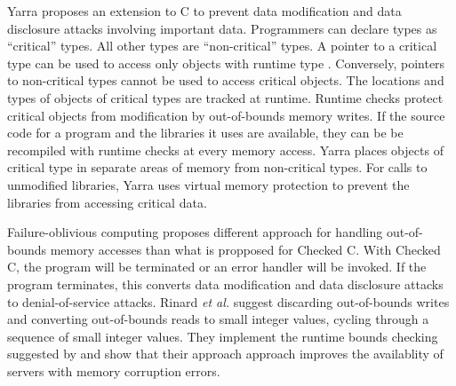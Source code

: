 Yarra \cite{Schlesinger2011} proposes an extension to C to prevent data
modification and data disclosure attacks involving important data. 
Programmers can declare types as ``critical'' types.  All other types
are ``non-critical'' types.  A pointer to a critical type  can 
be used to access only objects with runtime type .   Conversely, pointers
to non-critical types cannot be used to access critical objects. 
The locations and types of objects of critical types are 
tracked at runtime.  Runtime checks protect critical objects from modification
by out-of-bounds memory writes.  If the source code for a program and the libraries
it uses are available, they can be be recompiled with runtime checks at every memory
access.  Yarra places objects of critical type in separate areas of memory from
non-critical types. For calls to unmodified libraries, Yarra uses virtual memory
protection to prevent the libraries from accessing critical data.

Failure-oblivious computing \cite{Rinard2004} proposes different approach for
handling out-of-bounds memory accesses than what is propposed for Checked C.  
With Checked C,
the program will be terminated or an error handler will be invoked.  If the
program terminates, this converts data modification and data disclosure attacks to denial-of-service attacks.  Rinard {\it et al.} suggest discarding out-of-bounds
writes and converting out-of-bounds reads to small integer values, cycling
through a sequence of small integer values.   They implement the runtime
bounds checking suggested by \cite{Ruwase2004} and show that their approach
approach improves the availablity of servers with memory 
corruption errors.

